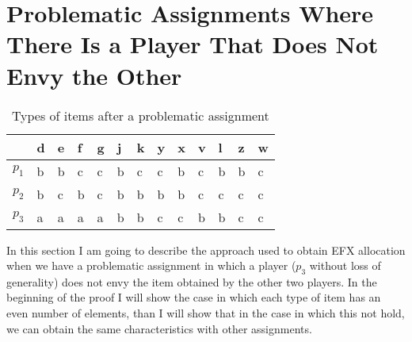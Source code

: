 \section{Problematic Assignments Where There Is a Player That Does Not Envy the Other}
\begin{table}[h]
\centering
\begin{tabular}{|l|l|l|l|l|l|l|l|l|l|l|l|l|}
\hline
      & d & e & f & g & j & k & y & x & v & l & z & w \\ \hline
$p_1$ & b & b & c & c & b & c & c & b & c & b & b & c \\ \hline
$p_2$ & b & c & b & c & b & b & b & b & c & c & c & c \\ \hline
$p_3$ & a & a & a & a & b & b & c & c & b & b & c & c \\ \hline
\end{tabular}
\caption{Types of items after a problematic assignment}
\end{table}
In this section I am going to describe the approach used to obtain EFX allocation when we have a problematic assignment in which a player ($p_3$ without loss of generality) does not envy the item obtained by the other two players. In the beginning of the proof I will show the case in which each type of item has an even number of elements, than I will show that in the case in which this not hold, we can obtain the same characteristics with other assignments. 
